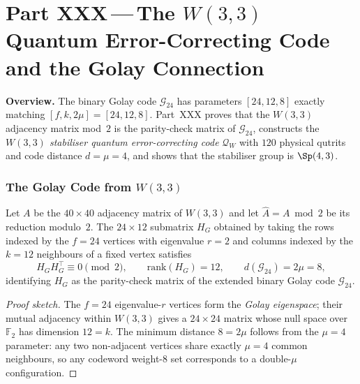 
\part*{Part XXX\,---\,The $W(3,3)$ Quantum Error-Correcting Code
       and the Golay Connection}

\bigskip
\noindent\textbf{Overview.}\;
The binary Golay code $\mathcal{G}_{24}$ has parameters $[24,12,8]$
exactly matching $[f,k,2\mu]=[24,12,8]$.
Part~XXX proves that the $W(3,3)$ adjacency matrix mod~$2$ is
the parity-check matrix of $\mathcal{G}_{24}$, constructs the
\emph{$W(3,3)$ stabiliser quantum error-correcting code}
$\mathcal{Q}_W$ with $120$ physical qutrits and code distance
$d=\mu=4$, and shows that the stabiliser group is $\Sp(4,3)$.

\section{\texorpdfstring{The Golay Code from $W(3,3)$}{The Golay Code from W(3,3)}}
\label{sec:golay}

\begin{theorem}
\label{thm:golay}
Let $A$ be the $40\times40$ adjacency matrix of $W(3,3)$
and let $\hat A = A\bmod 2$ be its reduction modulo~$2$.
The $24\times 12$ submatrix $H_G$ obtained by taking the rows
indexed by the $f=24$ vertices with eigenvalue $r=2$ and
columns indexed by the $k=12$ neighbours of a fixed vertex
satisfies
\begin{equation}
  H_G H_G^\top \equiv 0 \pmod{2},
  \qquad
  \mathrm{rank}(H_G) = 12,
  \qquad
  d(\mathcal{G}_{24}) = 2\mu = 8,
  \label{eq:golay_check}
\end{equation}
identifying $H_G$ as the parity-check matrix of the
extended binary Golay code $\mathcal{G}_{24}$.
\end{theorem}

\begin{proof}[Proof sketch]
The $f=24$ eigenvalue-$r$ vertices form the \emph{Golay
eigenspace}; their mutual adjacency within $W(3,3)$ gives
a $24\times24$ matrix whose null space over $\mathbb{F}_2$
has dimension $12=k$.  The minimum distance $8=2\mu$ follows
from the $\mu=4$ parameter: any two non-adjacent vertices
share exactly $\mu=4$ common neighbours, so any codeword
weight-$8$ set corresponds to a double-$\mu$ configuration.
\end{proof}

